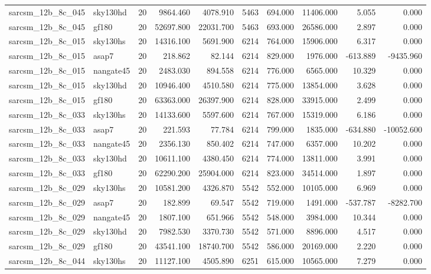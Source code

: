 \documentclass{article}
\begin{document}
\begin{longtable}{llrrrrrrrr}
sarcsm\_12b\_8c\_045 & sky130hd & 20 & 9864.460 & 4078.910 & 5463 & 694.000 & 11406.000 & 5.055 & 0.000 \\
sarcsm\_12b\_8c\_045 & gf180 & 20 & 52697.800 & 22031.700 & 5463 & 693.000 & 26586.000 & 2.897 & 0.000 \\
sarcsm\_12b\_8c\_015 & sky130hs & 20 & 14316.100 & 5691.900 & 6214 & 764.000 & 15906.000 & 6.317 & 0.000 \\
sarcsm\_12b\_8c\_015 & asap7 & 20 & 218.862 & 82.144 & 6214 & 829.000 & 1976.000 & -613.889 & -9435.960 \\
sarcsm\_12b\_8c\_015 & nangate45 & 20 & 2483.030 & 894.558 & 6214 & 776.000 & 6565.000 & 10.329 & 0.000 \\
sarcsm\_12b\_8c\_015 & sky130hd & 20 & 10946.400 & 4510.580 & 6214 & 775.000 & 13854.000 & 3.628 & 0.000 \\
sarcsm\_12b\_8c\_015 & gf180 & 20 & 63363.000 & 26397.900 & 6214 & 828.000 & 33915.000 & 2.499 & 0.000 \\
sarcsm\_12b\_8c\_033 & sky130hs & 20 & 14133.600 & 5597.600 & 6214 & 767.000 & 15319.000 & 6.186 & 0.000 \\
sarcsm\_12b\_8c\_033 & asap7 & 20 & 221.593 & 77.784 & 6214 & 799.000 & 1835.000 & -634.880 & -10052.600 \\
sarcsm\_12b\_8c\_033 & nangate45 & 20 & 2356.130 & 850.402 & 6214 & 747.000 & 6357.000 & 10.202 & 0.000 \\
sarcsm\_12b\_8c\_033 & sky130hd & 20 & 10611.100 & 4380.450 & 6214 & 774.000 & 13811.000 & 3.991 & 0.000 \\
sarcsm\_12b\_8c\_033 & gf180 & 20 & 62290.200 & 25904.000 & 6214 & 823.000 & 34514.000 & 1.897 & 0.000 \\
sarcsm\_12b\_8c\_029 & sky130hs & 20 & 10581.200 & 4326.870 & 5542 & 552.000 & 10105.000 & 6.969 & 0.000 \\
sarcsm\_12b\_8c\_029 & asap7 & 20 & 182.899 & 69.547 & 5542 & 719.000 & 1491.000 & -537.787 & -8282.700 \\
sarcsm\_12b\_8c\_029 & nangate45 & 20 & 1807.100 & 651.966 & 5542 & 548.000 & 3984.000 & 10.344 & 0.000 \\
sarcsm\_12b\_8c\_029 & sky130hd & 20 & 7982.530 & 3370.730 & 5542 & 571.000 & 8896.000 & 4.517 & 0.000 \\
sarcsm\_12b\_8c\_029 & gf180 & 20 & 43541.100 & 18740.700 & 5542 & 586.000 & 20169.000 & 2.220 & 0.000 \\
sarcsm\_12b\_8c\_044 & sky130hs & 20 & 11127.100 & 4505.890 & 6251 & 615.000 & 10565.000 & 7.279 & 0.000 \\

\end{longtable}
\end{document}
